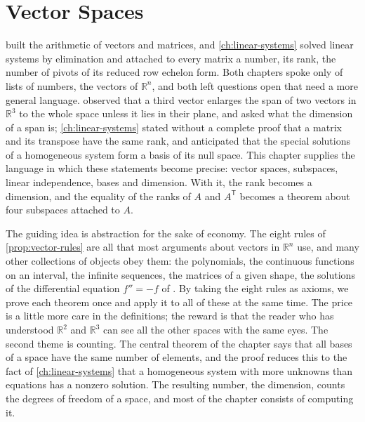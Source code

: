 \chapter{Vector Spaces}
\label{ch:vector-spaces}


 built the arithmetic of vectors and matrices, and \cref{ch:linear-systems} solved linear systems by elimination and attached to every matrix a number, its rank, the number of pivots of its reduced row echelon form. Both chapters spoke only of lists of numbers, the vectors of $\mathbb R^n$, and both left questions open that need a more general language.  observed that a third vector enlarges the span of two vectors in $\mathbb R^3$ to the whole space unless it lies in their plane, and asked what the dimension of a span is; \cref{ch:linear-systems} stated without a complete proof that a matrix and its transpose have the same rank, and anticipated that the special solutions of a homogeneous system form a basis of its null space. This chapter supplies the language in which these statements become precise: vector spaces, subspaces, linear independence, bases and dimension. With it, the rank becomes a dimension, and the equality of the ranks of $A$ and $A^{\mathsf T}$ becomes a theorem about four subspaces attached to $A$.

The guiding idea is abstraction for the sake of economy. The eight rules of \cref{prop:vector-rules} are all that most arguments about vectors in $\mathbb R^n$ use, and many other collections of objects obey them: the polynomials, the continuous functions on an interval, the infinite sequences, the matrices of a given shape, the solutions of the differential equation $f''=-f$ of . By taking the eight rules as axioms, we prove each theorem once and apply it to all of these at the same time. The price is a little more care in the definitions; the reward is that the reader who has understood $\mathbb R^2$ and $\mathbb R^3$ can see all the other spaces with the same eyes. The second theme is counting. The central theorem of the chapter says that all bases of a space have the same number of elements, and the proof reduces this to the fact of \cref{ch:linear-systems} that a homogeneous system with more unknowns than equations has a nonzero solution. The resulting number, the dimension, counts the degrees of freedom of a space, and most of the chapter consists of computing it.


